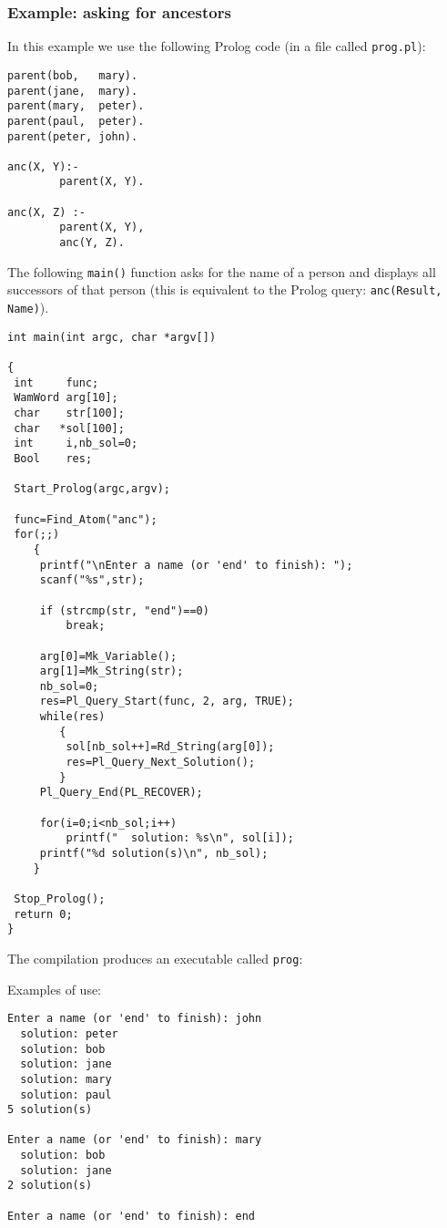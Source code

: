 \subsubsection{Example: asking for ancestors}

In this example we use the following Prolog code (in a file called 
\texttt{prog.pl}):

\begin{Indentation}
\begin{verbatim}
parent(bob,   mary).
parent(jane,  mary).
parent(mary,  peter).
parent(paul,  peter).
parent(peter, john).

anc(X, Y):-
        parent(X, Y).

anc(X, Z) :-
        parent(X, Y),
        anc(Y, Z).
\end{verbatim}
\end{Indentation}

The following \texttt{main()} function asks for the name of a person and
displays all successors of that person (this is equivalent to the Prolog
query: \texttt{anc(Result, Name)}).

\begin{Indentation}
\begin{verbatim}
int main(int argc, char *argv[])

{
 int     func;
 WamWord arg[10];
 char    str[100];
 char   *sol[100];
 int     i,nb_sol=0;
 Bool    res;

 Start_Prolog(argc,argv);

 func=Find_Atom("anc");
 for(;;)
    {
     printf("\nEnter a name (or 'end' to finish): ");
     scanf("%s",str);

     if (strcmp(str, "end")==0)
         break;

     arg[0]=Mk_Variable();
     arg[1]=Mk_String(str);
     nb_sol=0;
     res=Pl_Query_Start(func, 2, arg, TRUE);
     while(res)
        {
         sol[nb_sol++]=Rd_String(arg[0]);
         res=Pl_Query_Next_Solution();
        }
     Pl_Query_End(PL_RECOVER);

     for(i=0;i<nb_sol;i++)
         printf("  solution: %s\n", sol[i]);
     printf("%d solution(s)\n", nb_sol);
    }

 Stop_Prolog();
 return 0;     
}
\end{verbatim}
\end{Indentation}

The compilation produces an executable called \texttt{prog}:


Examples of use:

\begin{Indentation}
\begin{verbatim}
Enter a name (or 'end' to finish): john
  solution: peter
  solution: bob
  solution: jane
  solution: mary
  solution: paul
5 solution(s)

Enter a name (or 'end' to finish): mary
  solution: bob
  solution: jane
2 solution(s)

Enter a name (or 'end' to finish): end
\end{verbatim}
\end{Indentation}

